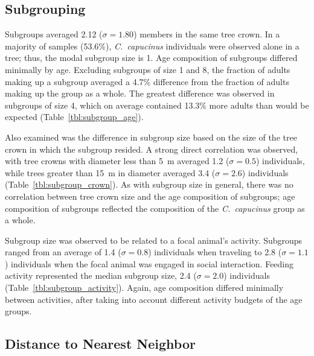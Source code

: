 \documentclass[american]{../../../coursework}
\begin{document}
\subsection{Subgrouping}

Subgroups averaged 2.12 (\(\sigma = 1.80\)) members in the same tree crown. In
a majority of samples (53.6\%), \emph{C.~capucinus} individuals were observed
alone in a tree; thus, the modal subgroup size is 1. Age composition of
subgroups differed minimally by age. Excluding subgroups of size 1 and 8, the
fraction of adults making up a subgroup averaged a 4.7\% difference from the
fraction of adults making up the group as a whole. The greatest difference was
observed in subgroups of size 4, which on average contained 13.3\% more adults
than would be expected (Table~\ref{tbl:subgroup_age}).

Also examined was the difference in subgroup size based on the size of the
tree crown in which the subgroup resided. A strong direct correlation was
observed, with tree crowns with diameter less than \SI{5}{\metre} averaged 1.2
(\(\sigma = 0.5\)) individuals, while trees greater than \SI{15}{\metre} in
diameter averaged 3.4 (\(\sigma = 2.6\)) individuals
(Table~\ref{tbl:subgroup_crown}). As with subgroup size in general, there was
no correlation between tree crown size and the age composition of subgroups;
age composition of subgroups reflected the composition of the
\emph{C.~capucinus} group as a whole.

Subgroup size was observed to be related to a focal animal's activity.
Subgroups ranged from an average of 1.4 (\(\sigma = 0.8\)) individuals when
traveling to 2.8 (\(\sigma = 1.1\)) individuals when the focal animal was
engaged in social interaction. Feeding activity represented the median
subgroup size, 2.4 (\(\sigma = 2.0\)) individuals
(Table~\ref{tbl:subgroup_activity}). Again, age composition differed minimally
between activities, after taking into account different activity budgets of
the age groups.

\subsection{Distance to Nearest Neighbor}
\end{document}
